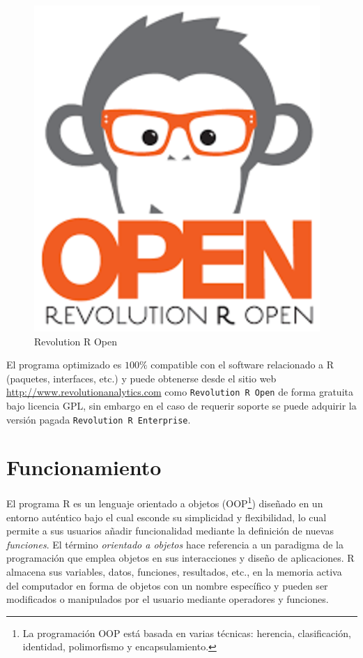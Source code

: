 \documentclass[11pt,a4paper,oneside]{book}\usepackage[]{graphicx}\usepackage[]{color}
\begin{document}
\begin{figure}[H]
\centering
\includegraphics[scale=.6]{figuras/logo_rro.eps}
\caption{Revolution R Open}
\end{figure}

El programa optimizado es $100\%$ compatible con el software relacionado a R (paquetes, interfaces, etc.) y puede obtenerse desde el sitio web \url{http://www.revolutionanalytics.com} como \texttt{Revolution R Open} de forma gratuita bajo licencia GPL, sin embargo en el caso de requerir soporte se puede adquirir la versión pagada \texttt{Revolution R Enterprise}.


\section{Funcionamiento}

El programa R es un lenguaje orientado a objetos (OOP\footnote{La programación OOP está basada en varias técnicas: herencia, clasificación, identidad, polimorfismo y encapsulamiento.}) dise\~nado en un entorno auténtico bajo el cual esconde su simplicidad y flexibilidad, lo cual permite a sus usuarios a\~nadir funcionalidad mediante la definición de nuevas \emph{funciones}. El término \emph{orientado a objetos} hace referencia a un paradigma de la programación que emplea objetos en sus interacciones y diseño de aplicaciones. R almacena sus variables, datos, funciones, resultados, etc., en la memoria activa del computador en forma de objetos con un nombre específico y pueden ser modificados o manipulados por el usuario mediante operadores y funciones.\newline
\end{document}
